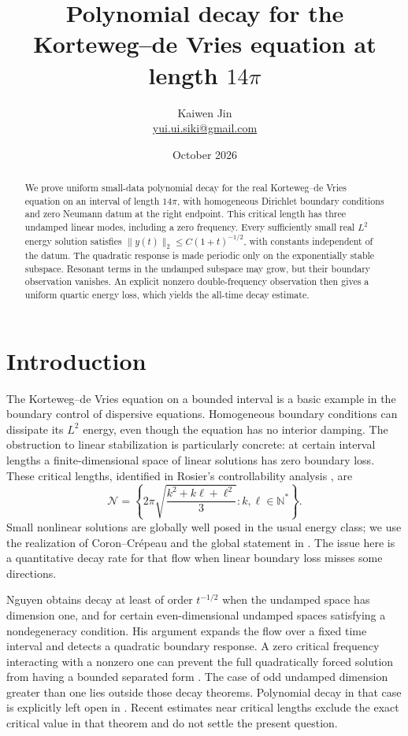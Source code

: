 \documentclass[11pt]{article}
\title{Polynomial decay for the Korteweg--de Vries equation at length $14\pi$}
\author{Kaiwen Jin\\\small\href{mailto:yui.ui.siki@gmail.com}{yui.ui.siki@gmail.com}}
\date{October 2026}
\theoremstyle{remark}\newtheorem{remark}[theorem]{Remark}
\numberwithin{equation}{section}
\begin{document}
\maketitle
\begin{abstract}
We prove uniform small-data polynomial decay for the real Korteweg--de Vries
equation on an interval of length $14\pi$, with homogeneous Dirichlet boundary
conditions and zero Neumann datum at the right endpoint. This critical length
has three undamped linear modes, including a zero frequency. Every sufficiently
small real $L^2$ energy solution satisfies $\|y(t)\|_2\le C(1+t)^{-1/2}$,
with constants independent of the datum. The quadratic response is made
periodic only on the exponentially stable subspace. Resonant terms in the
undamped subspace may grow, but their boundary observation vanishes. An explicit
nonzero double-frequency observation then gives a uniform quartic energy loss,
which yields the all-time decay estimate.
\end{abstract}

\section{Introduction}\label{sec:intro}
The Korteweg--de Vries equation on a bounded interval is a basic example in
the boundary control of dispersive equations. Homogeneous boundary conditions
can dissipate its $L^2$ energy, even though the equation has no interior damping.
The obstruction to linear stabilization is particularly concrete: at certain
interval lengths a finite-dimensional space of linear solutions has zero
boundary loss. These critical lengths, identified in Rosier's controllability
analysis \cite{Rosier}, are
\[
 \mathcal N=\left\{2\pi\sqrt{\frac{k^2+k\ell+\ell^2}{3}}:
 k,\ell\in\mathbb N^*\right\}.
\]
Small nonlinear solutions are globally well posed in the usual energy class;
we use the realization of Coron--Cr\'epeau \cite{CC} and the global statement
in \cite[Lemma 3.2]{NX25}. The issue here is a quantitative decay rate for
that flow when linear boundary loss misses some directions.

Nguyen \cite[Theorem 1.1]{Nguyen} obtains decay at least of order $t^{-1/2}$
when the undamped space has dimension one, and for certain even-dimensional
undamped spaces satisfying a nondegeneracy condition. His argument expands
the flow over a fixed time interval and detects a quadratic boundary response.
A zero critical frequency interacting with a nonzero one can prevent the full
quadratically forced solution from having a bounded separated form
\cite[Remark 2.6]{Nguyen}. The case of odd undamped dimension greater than one lies outside those decay theorems. Polynomial decay in that case is explicitly
left open in \cite[Section 2.4.5]{NX25}. Recent estimates near critical lengths
\cite[Theorem 1.6]{NX26} exclude the exact critical value in that theorem and
do not settle the present question.
\end{document}

